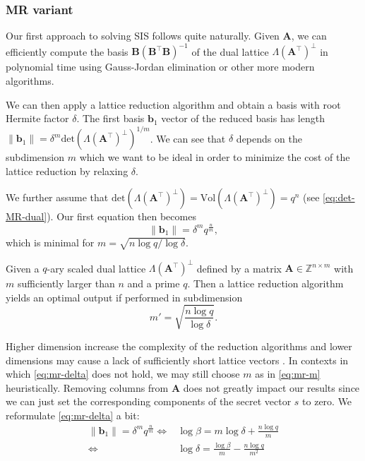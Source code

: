 \subsubsection{MR variant \cite{MR09}} \label{sec:mr-variant}
Our first approach to solving SIS follows quite naturally. Given $\mathbf{A}$, we can efficiently compute the basis $\mathbf{B} (\mathbf{B}^\intercal \mathbf{B})^{-1}$ of the dual lattice $\Lambda(\mathbf{A}^\intercal)^{\perp}$ in polynomial time using Gauss-Jordan elimination or other more modern algorithms.

We can then apply a lattice reduction algorithm and obtain a basis with root Hermite factor $\delta$. The first basis $\mathbf{b}_1$ vector of the reduced basis has length $\|\mathbf{b}_1\| = \delta^m \text{det}(\Lambda(\mathbf{A}^\intercal)^{\perp})^{1/m}$. We can see that $\delta$ depends on the subdimension $m$ which we want to be ideal in order to minimize the cost of the lattice reduction by relaxing $\delta$.

We further assume that $\text{det}(\Lambda(\mathbf{A}^\intercal)^{\perp}) = \text{Vol}(\Lambda(\mathbf{A}^\intercal)^{\perp}) = q^n$ (see \cref{eq:det-MR-dual}). Our first equation then becomes
\begin{equation}\label{eq:mr-delta}
  \|\mathbf{b}_1\| = \delta^m q^{\frac{n}{m}},
\end{equation}
which is minimal for $m = \sqrt{n \log q / \log \delta}$.
\begin{theorem}
  Given a $q$-ary scaled dual lattice  $\Lambda(\mathbf{A}^\intercal)^{\perp}$ defined by a matrix $\mathbf{A} \in \mathbb{Z}^{n \times m}$ with $m$ sufficiently larger than $n$ and a prime $q$. Then a lattice reduction algorithm yields an optimal output if performed in subdimension
  \begin{equation}
    m' = \sqrt{\frac{n \log q}{\log \delta}}. \label{eq:mr-m}
  \end{equation}
\end{theorem}

Higher dimension increase the complexity of the reduction algorithms and lower dimensions may cause a lack of sufficiently short lattice vectors \cite{MR09}. In contexts in which \cref{eq:mr-delta} does not hold, we may still choose $m$ as in \cref{eq:mr-m} heuristically. Removing columns from $\mathbf{A}$ does not greatly impact our results since we can just set the corresponding components of the secret vector $s$ to zero. We reformulate \cref{eq:mr-delta} a bit:
\begin{align}
  \|\mathbf{b}_1\| = \delta^m q^{\frac{n}{m}} \iff & \log \beta = m \log \delta + \frac{n \log q}{m}                                   \\
  \iff                                             & \log \delta = \frac{\log \beta}{m} - \frac{n \log q}{m^2} \label{eq:mr-log-delta}
\end{align}

